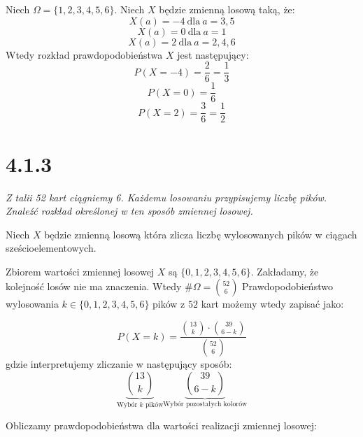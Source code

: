 \documentclass{article}
\begin{document}
Niech \(\Omega = \{1, 2, 3, 4, 5, 6\}\). Niech \(X\) będzie zmienną losową taką, że:
\begin{equation*}
    X(a) = -4 \ \mbox{dla} \ a = 3, 5
\end{equation*}
\begin{equation*}
    X(a) = 0 \ \mbox{dla} \ a = 1
\end{equation*}
\begin{equation*}
    X(a) = 2 \ \mbox{dla} \ a = 2, 4, 6
\end{equation*}
Wtedy rozkład prawdopodobieństwa \(X\) jest następujący:
\begin{equation*}
    P(X = -4) = \frac{2}{6} = \frac{1}{3}
\end{equation*}
\begin{equation*}
    P(X = 0) = \frac{1}{6}
\end{equation*}
\begin{equation*}
    P(X = 2) = \frac{3}{6} = \frac{1}{2}
\end{equation*}

\section*{4.1.3}

\begin{center}
    \emph{Z talii 52 kart ciągniemy 6. Każdemu losowaniu przypisujemy liczbę pików. Znaleźć rozkład określonej w ten sposób
zmiennej losowej.}
\end{center}

Niech \(X\) będzie zmienną losową która zlicza liczbę wylosowanych pików w ciągach sześcioelementowych.
\par Zbiorem wartości zmiennej losowej \(X\) są \(\{0, 1, 2, 3, 4, 5, 6\}\). Zakładamy, że kolejność losów nie ma znaczenia.
Wtedy \(\# \Omega = {\binom{52}{6}}\)
Prawdopodobieństwo wylosowania \(k \in \{0, 1, 2, 3, 4, 5, 6\}\) pików z \(52\) kart możemy wtedy zapisać jako:

\begin{equation*}
    P(X = k) = \frac{\binom{13}{k} \cdot \binom{39}{6 - k}}{\binom{52}{6}}
\end{equation*}
gdzie interpretujemy zliczanie w następujący sposób:
\begin{equation*}
    \underbrace{\binom{13}{k}}_\text{Wybór \(k\) pików} \underbrace{\binom{39}{6 - k}}_\text{Wybór pozostałych kolorów}
\end{equation*}

Obliczamy prawdopodobieństwa dla wartości realizacji zmiennej losowej:
\end{document}

